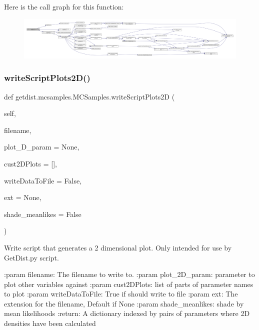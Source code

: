 Here is the call graph for this function\+:
\nopagebreak
\begin{figure}[H]
\begin{center}
\leavevmode
\includegraphics[width=350pt]{classgetdist_1_1mcsamples_1_1MCSamples_a658aa2c258861d420985ec8065481efa_cgraph}
\end{center}
\end{figure}
\mbox{\label{classgetdist_1_1mcsamples_1_1MCSamples_a23206744ace06726c8026481294f3f63}} 
\subsubsection{\texorpdfstring{write\+Script\+Plots2\+D()}{writeScriptPlots2D()}}
{\footnotesize\ttfamily def getdist.\+mcsamples.\+M\+C\+Samples.\+write\+Script\+Plots2D (\begin{DoxyParamCaption}\item[{}]{self,  }\item[{}]{filename,  }\item[{}]{plot\+\_\+D\+\_\+param = {\ttfamily None},  }\item[{}]{cust2\+D\+Plots = {\ttfamily \mbox{[}\mbox{]}},  }\item[{}]{write\+Data\+To\+File = {\ttfamily False},  }\item[{}]{ext = {\ttfamily None},  }\item[{}]{shade\+\_\+meanlikes = {\ttfamily False} }\end{DoxyParamCaption})}

\begin{DoxyVerb}Write script that generates a 2 dimensional plot. Only intended for use by GetDist.py script.

:param filename: The filename to write to.
:param plot_2D_param: parameter to plot other variables against 
:param cust2DPlots: list of parts of parameter names to plot
:param writeDataToFile: True if should write to file
:param ext: The extension for the filename, Default if None
:param shade_meanlikes: shade by mean likelihoods
:return: A dictionary indexed by pairs of parameters where 2D densities have been calculated
\end{DoxyVerb}
 

